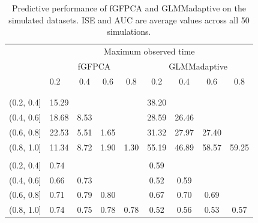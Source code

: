 \documentclass[
  11pt,
]{article}
\begin{document}
\begin{table}

\caption{\label{tab:format table}Predictive performance of fGFPCA and GLMMadaptive on the simulated datasets. ISE and AUC are average values across all 50 simulations.}
\centering
\begin{tabular}[t]{llccccccc}
\toprule
\multicolumn{1}{c}{ } & \multicolumn{8}{c}{Maximum observed time} \\
\cmidrule(l{3pt}r{3pt}){2-9}
\multicolumn{1}{c}{ } & \multicolumn{4}{c}{fGFPCA} & \multicolumn{4}{c}{GLMMadaptive} \\
\cmidrule(l{3pt}r{3pt}){2-5} \cmidrule(l{3pt}r{3pt}){6-9}
  & 0.2 & 0.4 & 0.6 & 0.8 & 0.2 & 0.4 & 0.6 & 0.8\\
\midrule
\addlinespace[0.3em]
\multicolumn{9}{l}{\textbf{Prediction time window}}\\
\addlinespace[0.3em]
\multicolumn{9}{l}{\textbf{ISE}}\\
\hspace{1em}\hspace{1em}(0.2, 0.4] & 15.29 &  &  &  & 38.20 &  &  & \\
\hspace{1em}\hspace{1em}(0.4, 0.6] & 18.68 & 8.53 &  &  & 28.59 & 26.46 &  & \\
\hspace{1em}\hspace{1em}(0.6, 0.8] & 22.53 & 5.51 & 1.65 &  & 31.32 & 27.97 & 27.40 & \\
\hspace{1em}\hspace{1em}(0.8, 1.0] & 11.34 & 8.72 & 1.90 & 1.30 & 55.19 & 46.89 & 58.57 & 59.25\\
\addlinespace[0.3em]
\multicolumn{9}{l}{\textbf{AUC}}\\
\hspace{1em}\hspace{1em}(0.2, 0.4] & 0.74 &  &  &  & 0.59 &  &  & \\
\hspace{1em}\hspace{1em}(0.4, 0.6] & 0.66 & 0.73 &  &  & 0.52 & 0.59 &  & \\
\hspace{1em}\hspace{1em}(0.6, 0.8] & 0.71 & 0.79 & 0.80 &  & 0.67 & 0.70 & 0.69 & \\
\hspace{1em}\hspace{1em}(0.8, 1.0] & 0.74 & 0.75 & 0.78 & 0.78 & 0.52 & 0.56 & 0.53 & 0.57\\
\bottomrule
\end{tabular}
\end{table}
\end{document}
